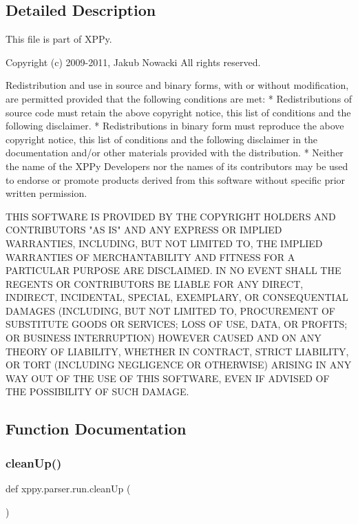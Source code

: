 \subsection{Detailed Description}
\begin{DoxyVerb}This file is part of XPPy.

Copyright (c) 2009-2011, Jakub Nowacki
All rights reserved.

Redistribution and use in source and binary forms, with or without
modification, are permitted provided that the following conditions are met:
    * Redistributions of source code must retain the above copyright
      notice, this list of conditions and the following disclaimer.
    * Redistributions in binary form must reproduce the above copyright
      notice, this list of conditions and the following disclaimer in the
      documentation and/or other materials provided with the distribution.
    * Neither the name of the XPPy Developers nor the
      names of its contributors may be used to endorse or promote products
      derived from this software without specific prior written permission.

THIS SOFTWARE IS PROVIDED BY THE COPYRIGHT HOLDERS AND CONTRIBUTORS "AS IS" AND
ANY EXPRESS OR IMPLIED WARRANTIES, INCLUDING, BUT NOT LIMITED TO, THE IMPLIED
WARRANTIES OF MERCHANTABILITY AND FITNESS FOR A PARTICULAR PURPOSE ARE
DISCLAIMED. IN NO EVENT SHALL THE REGENTS OR CONTRIBUTORS BE LIABLE FOR ANY
DIRECT, INDIRECT, INCIDENTAL, SPECIAL, EXEMPLARY, OR CONSEQUENTIAL DAMAGES
(INCLUDING, BUT NOT LIMITED TO, PROCUREMENT OF SUBSTITUTE GOODS OR SERVICES;
LOSS OF USE, DATA, OR PROFITS; OR BUSINESS INTERRUPTION) HOWEVER CAUSED AND
ON ANY THEORY OF LIABILITY, WHETHER IN CONTRACT, STRICT LIABILITY, OR TORT
(INCLUDING NEGLIGENCE OR OTHERWISE) ARISING IN ANY WAY OUT OF THE USE OF THIS
SOFTWARE, EVEN IF ADVISED OF THE POSSIBILITY OF SUCH DAMAGE.
\end{DoxyVerb}
 

\subsection{Function Documentation}
\mbox{\label{namespacexppy_1_1parser_1_1run_adbf6786b0b0e4127eca343570c49d19b}} 
\subsubsection{\texorpdfstring{clean\+Up()}{cleanUp()}}
{\footnotesize\ttfamily def xppy.\+parser.\+run.\+clean\+Up (\begin{DoxyParamCaption}{ }\end{DoxyParamCaption})}

